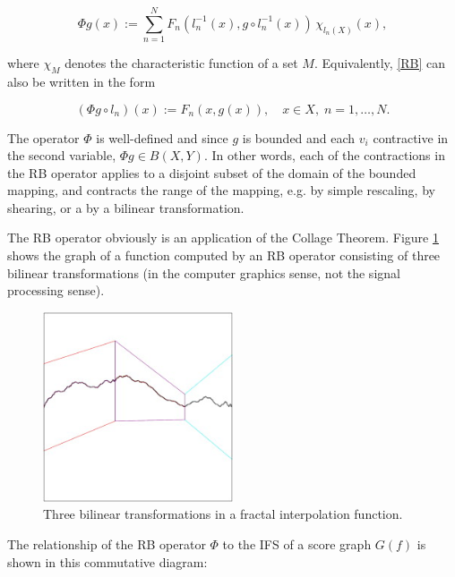 \documentclass[english,11pt,letterpaper,onecolumn]{scrartcl}
\numberwithin{equation}{section}
\newcommand{\cF}{\mathcal{F}}
\newcommand{\be}{\begin{equation}}
\newcommand{\ee}{\end{equation}}
\begin{document}
\be\label{RB}
\Phi g (x) := \sum\limits_{n=1}^N F_n (l_n^{-1} (x), g\circ l_n^{-1}
(x))\,\chi_{l_n(X)}(x),
\ee

\noindent where $\chi_M$ denotes the characteristic function of a set $M$.
Equivalently, \eqref{RB} can also be written in the form

\be\label{3.3}
(\Phi g \circ l_n) (x) := F_n (x, g(x)),\quad x\in X, \;n = 1, \ldots, N.
\ee

\noindent The operator $\Phi$ is well-defined and since $g$ is bounded and each
$v_i$ contractive in the second variable, $\Phi g\in B(X,Y)$.  In other words,
each of the contractions in the RB operator applies to a disjoint subset of the
domain of the bounded mapping, and contracts the range of the mapping, e.g. by
simple rescaling, by shearing, or a by a bilinear transformation.

The RB operator obviously is an application of the Collage Theorem. Figure
\ref{fig:fif} shows the graph of a function computed by an RB operator
consisting of three bilinear transformations (in the computer graphics sense,
not the signal processing sense).

\begin{figure}
\centerline{\includegraphics[width = 0.5\textwidth]{interp}}
\caption{\label{fig:fif} Three bilinear transformations in
a fractal interpolation function.\protect\footnotemark}
\end{figure}


The relationship of the RB operator $\Phi$ to the IFS of a score graph
$G(f)$ is shown in this commutative diagram:

\end{document}
